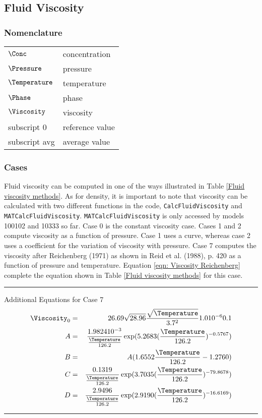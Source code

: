 \subsection{Fluid Viscosity}
\subsubsection*{Nomenclature}
\begin{tabular}{ll}
$\Conc$ & concentration\\
$\Pressure$ & pressure\\
$\Temperature$ & temperature\\
$\Phase$ & phase\\
$\Viscosity$ & viscosity\\
subscript 0 &  reference value\\
subscript avg & average value\\
\end{tabular}

\subsubsection*{Cases}

Fluid viscosity can be computed in one of the ways illustrated in
Table \ref{Fluid viscosity methods}.  As for density, it is
important to note that  viscosity can be calculated with two
different functions in the code, \texttt{CalcFluidViscosity} and
\texttt{MATCalcFluidViscosity}.  \texttt{MATCalcFluidViscosity} is
only accessed by models 100102 and 10333 so far.  Case 0 is the
constant viscosity case. Cases 1 and 2 compute viscosity as a
function of pressure. Case 1 uses a curve, whereas case 2 uses a
coefficient for the variation of viscosity with pressure.  Case 7
computes the viscosity after Reichenberg (1971) as shown in Reid
et al. (1988), p. 420 as a function of pressure and temperature.
Equation \ref{eqn: Viscosity Reichenberg} complete the equation
shown in Table \ref{Fluid viscosity methods} for this case.
\\
\hrule
Additional Equations for Case 7
\begin{eqnarray}
\centering
\Viscosity_0 &=& 26.69 \sqrt{28.96} \frac{\sqrt{\Temperature}}{3.7^2} 1.0 10^{-6} 0.1\nonumber\\
A &=& \frac{1.9824 10^{-3}}{\frac{\Temperature}{126.2}}\exp(5.2683(\frac{\Temperature}{126.2})^{-0.5767})\nonumber\\
B &=& A ( 1.6552 \frac{\Temperature}{126.2} - 1.2760)\nonumber\\
C &=& \frac{0.1319}{\frac{\Temperature}{126.2}} \exp(3.7035(\frac{\Temperature}{126.2})^{-79.8678})\nonumber\\
D &=& \frac{2.9496}{\frac{\Temperature}{126.2}} \exp(2.9190(\frac{\Temperature}{126.2})^{-16.6169})\nonumber\\
\label{eqn: Viscosity Reichenberg}
\end{eqnarray}\nopagebreak
\hrule

